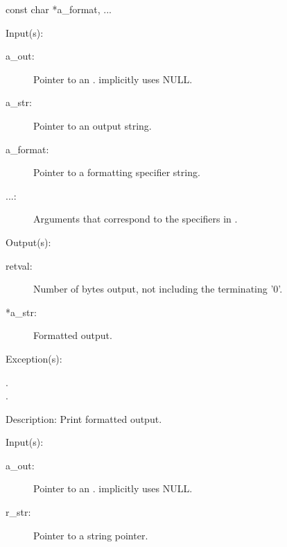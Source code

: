 \begin{capi}
{{const char *a\_format, ...}}
\label{_cw_out_put_s}
	\begin{capilist}
	\item[Input(s): ]
		\begin{description}\item[]
		\item[a\_out: ]
			Pointer to an .
			 implicitly uses NULL.
		\item[a\_str: ]
			Pointer to an output string.
		\item[a\_format: ]
			Pointer to a formatting specifier string.
		\item[...: ]
			Arguments that correspond to the specifiers in
			.
		\end{description}
	\item[Output(s): ]
		\begin{description}\item[]
		\item[retval: ]
			Number of bytes output, not including the terminating
			'{\bs}0'.
		\item[*a\_str: ]
			Formatted output.
		\end{description}
	\item[Exception(s): ]
		\begin{description}\item[]
		\item[.]
		\item[.]
		\end{description}
	\item[Description: ]
		Print formatted output.
	\end{capilist}
\label{out_put_sa}
	\begin{capilist}
	\item[Input(s): ]
		\begin{description}\item[]
		\item[a\_out: ]
			Pointer to an \classname{out}.
			 implicitly uses NULL.
		\item[r\_str: ]
			Pointer to a string pointer.

\end{description}
\end{capilist}
\end{capi}
